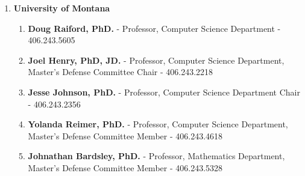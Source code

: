 \documentclass[oneside]{article}%
\begin{document}
\begin{enumerate}[]
\begin{enumerate}[]
		\end{enumerate}
	\item \large \textbf{University of Montana} \small
		\begin{enumerate}[]
			\item \textbf{Doug Raiford, PhD.} - Professor, Computer Science Department - 406.243.5605
			\item \textbf{Joel Henry, PhD, JD.} - Professor, Computer Science Department, Master's Defense Committee Chair - 406.243.2218
			\item \textbf{Jesse Johnson, PhD.} - Professor, Computer Science Department Chair - 406.243.2356
			\item \textbf{Yolanda Reimer, PhD.} - Professor, Computer Science Department, Master's Defense Committee Member - 406.243.4618
			\item \textbf{Johnathan Bardsley, PhD.} - Professor, Mathematics Department, Master's Defense Committee Member - 406.243.5328
		\end{enumerate}
\end{enumerate}
\end{document}
